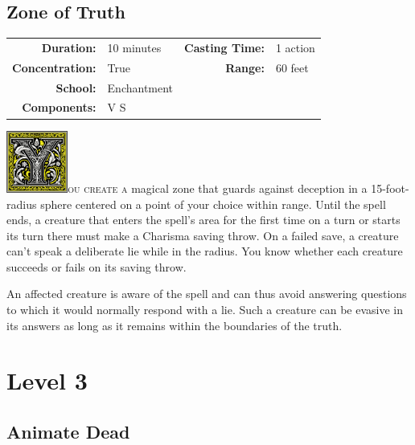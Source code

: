 \documentclass[12pt,showtrims]{memoir}
\begin{document}
\section*{Zone of Truth}

{
\small\centering\vspace{-6pt}
\begin{tabular}{rlrl}
\toprule

\textbf{Duration:} & 10 minutes &
\textbf{Casting Time:} & 1 action \\
\textbf{Concentration:} & True &
\textbf{Range:} & 60 feet \\
\textbf{School:} & Enchantment \\
\textbf{Components:} & \multicolumn{3}{p{0.7\textwidth}}{V S}\\

\bottomrule
\end{tabular}
}
\vspace{1\baselineskip}\noindent 
\lettrine[lines=4]{\includegraphics[height=58pt]{initials/Y.png}}{ou create a} magical zone that guards against deception in a 15-foot-radius sphere centered on a point of your choice within range. Until the spell ends, a creature that enters the spell’s area for the first time on a turn or starts its turn there must make a Charisma saving throw. On a failed save, a creature can’t speak a deliberate lie while in the radius. You know whether each creature succeeds or fails on its saving throw.

An affected creature is aware of the spell and can thus avoid answering questions to which it would normally respond with a lie. Such a creature can be evasive in its answers as long as it remains within the boundaries of the truth.
\newpage
{}
\newpage
\chapter*{Level 3} 
\section*{Animate Dead}
\end{document}
